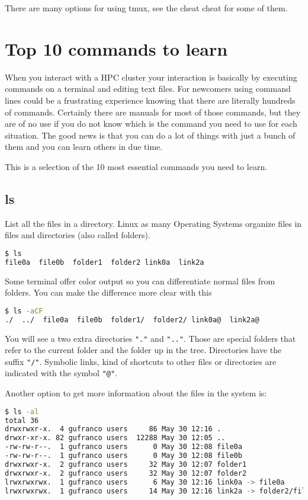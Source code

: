 There are many options for using tmux, see the cheat cheat for some of them.

\section{Top 10 commands to learn}

When you interact with a HPC cluster your interaction is basically by executing commands on a terminal and editing text files. For newcomers using command lines could be a frustrating experience knowing that there are literally hundreds of commands. Certainly there are manuals for most of those commands, but they are of no use if you do not know which is the command you need to use for each situation. The good news is that you can do a lot of things with just a bunch of them and you can learn others in due time.

This is a selection of the 10 most essential commands you need to learn.

\subsection{ls}

List all the files in a directory. Linux as many Operating Systems organize files in files and directories (also called folders). 

\begin{lstlisting}[language=bash]
$ ls
file0a  file0b  folder1  folder2 link0a  link2a
\end{lstlisting}

Some terminal offer color output so you can differentiate normal files from folders. You can make the difference more clear with this

\begin{lstlisting}[language=bash]
$ ls -aCF
./  ../  file0a  file0b  folder1/  folder2/ link0a@  link2a@
\end{lstlisting}

You will see a two extra directories \texttt{"."} and \texttt{".."}. Those are special folders that refer to the current folder and the folder up in the tree.
Directories have the suffix \texttt{"/"}. Symbolic links, kind of shortcuts to other files or directories are indicated with the symbol \texttt{"@"}.

Another option to get more information about the files in the system is:

\begin{lstlisting}[language=bash]
$ ls -al
total 36
drwxrwxr-x.  4 gufranco users     86 May 30 12:16 .
drwxr-xr-x. 82 gufranco users  12288 May 30 12:05 ..
-rw-rw-r--.  1 gufranco users      0 May 30 12:08 file0a
-rw-rw-r--.  1 gufranco users      0 May 30 12:08 file0b
drwxrwxr-x.  2 gufranco users     32 May 30 12:07 folder1
drwxrwxr-x.  2 gufranco users     32 May 30 12:07 folder2
lrwxrwxrwx.  1 gufranco users      6 May 30 12:16 link0a -> file0a
lrwxrwxrwx.  1 gufranco users     14 May 30 12:16 link2a -> folder2/file2a
\end{lstlisting}

